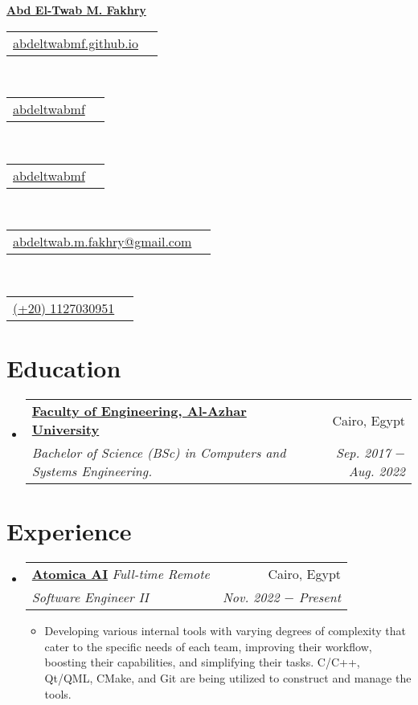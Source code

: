 \documentclass[letterpaper, 11pt]{article}
\makeatletter
\newcommand{\education}[6] {
	\vspace{-1pt}\item[]
  \begin{tabular*}{1\textwidth}[t]{l@{\extracolsep{\fill}}r}
		#1 \href{#2}{\textbf{\color{RoyalBlue}#3}} & #4 \\
    \textit{\small #5} & \textit{\small #6} \\
  \end{tabular*}
  \vspace{-4pt}
}
\newcommand{\experience}[7] {
	\vspace{-1pt}\item[]
  \begin{tabular*}{1\textwidth}[t]{l@{\extracolsep{\fill}}r}
		#1 \href{#2}{\textbf{\color{RoyalBlue}#3}}
		\textbar{} \textit{\footnotesize#4} & #5 \\
		\textit{\small #6} & \textit{\small #7} \\
  \end{tabular*}
  \vspace{-8pt}
}
\newcommand{\subexperience}[1] {
\item\small
  {#1}
  \vspace{-2pt}
}
\newcommand{\name}[2] {
  \textbf{
    \href{#1}{\Huge{#2}}
  }
  \vspace{-4pt}
}
\newcommand{\contact}[4] {
  \begin{tabular}{lr}
    {\href{#1}{\color{#3} #2 #4}}
  \end{tabular}
  \vspace{-4pt}
}
\makeatother
\begin{document}
\name{https://abdeltwabmf.github.io}{Abd El-Twab M. Fakhry}

\begin{center}
  \small
  \contact
  {https://abdeltwabmf.github.io}
  {\faIcon{globe}}{RoyalBlue}{abdeltwabmf.github.io}\,
  \contact
  {https://www.linkedin.com/in/abdeltwabmf}
  {\faIcon{linkedin}}{RoyalBlue}{abdeltwabmf}\,
  \contact
  {https://github.com/AbdeltwabMF}
  {\faIcon{github}}{RoyalBlue}{abdeltwabmf}\,
  \contact
  {mailto:abdeltwab.m.fakhry@gmail.com}
  {\faIcon{envelope}}{RoyalBlue}{abdeltwab.m.fakhry@gmail.com}\,
  \contact
  {tel:+201127030951}
  {\faIcon{mobile-alt}}{RoyalBlue}{(+20) 1127030951}
\end{center}\vspace{8pt}

\section{Education}
\begin{itemize}[leftmargin=0pt]
  \education
  {\faIcon{university}}
	{https://eng-azhar.net/}
  {Faculty of Engineering, Al-Azhar University}{ Cairo, Egypt}
  {Bachelor of Science (BSc) in Computers and Systems Engineering.}{Sep. 2017 $-$ Aug. 2022}
\end{itemize}

\section{Experience}
\begin{itemize}[leftmargin=0pt]
  \experience
	{\faIcon{briefcase}}
	{https://atomica.ai/}{Atomica AI}{Full-time \textbar{} Remote}{Cairo, Egypt}
  {Software Engineer II}{Nov. 2022 $-$ Present}

  \begin{itemize}
    \subexperience
		{Developing various internal tools with varying degrees of complexity that cater to the specific needs of each team, improving their workflow, boosting their capabilities, and simplifying their tasks. C/C++, Qt/QML, CMake, and Git are being utilized to construct and manage the tools.}
  \end{itemize}\vspace{-4pt}
\end{itemize}

\end{document}
